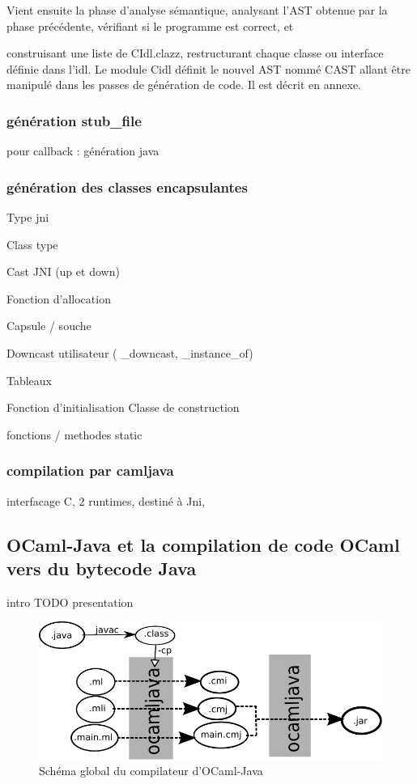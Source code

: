 \documentclass[a4paper, 11pt, notitlepage]{article}
\begin{document}
Vient ensuite la phase d'analyse sémantique, analysant l'AST obtenue par la
phase précédente, vérifiant si le programme est correct, et

construisant une liste de CIdl.clazz, restructurant chaque classe ou interface définie dans l'idl. 
Le module Cidl définit le nouvel AST nommé CAST allant être manipulé dans les passes de
génération de code. Il est décrit en annexe.

\subsubsection{génération stub\_file}
pour callback : génération java

\subsubsection{génération des classes encapsulantes}

Type jni

Class type

Cast JNI (up et down)

Fonction d'allocation

Capsule / souche

Downcast utilisateur (
\_downcast,
\_instance\_of)

Tableaux

Fonction d'initialisation
Classe de construction

fonctions / methodes static

\subsubsection{compilation par camljava}
interfacage C, 2 runtimes, destiné à Jni, 












\newpage
\subsection{OCaml-Java et la compilation de code OCaml vers du bytecode Java}
intro TODO presentation

\begin{figure}[h]
  \centering
  \includegraphics{schemaOCamlJava.pdf}
  \caption{Schéma global du compilateur d'OCaml-Java}
\end{figure}
\end{document}
